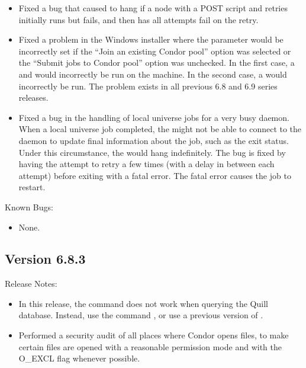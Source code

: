 \begin{itemize}
\item Fixed a bug that caused  to hang if a node
with a POST script and retries initially runs but fails, and then
has all  attempts fail on the retry.

\item Fixed a problem in the Windows installer where the
 parameter would be incorrectly set if the ``Join
an existing Condor pool'' option was selected or the ``Submit jobs to
Condor pool'' option was unchecked.  In the first case, a
 and  would incorrectly be run on
the machine. In the second case, a  would incorrectly
be run. The problem exists in all previous 6.8 and 6.9 series
releases.

\item Fixed a bug in the handling of local universe jobs
for a very busy  daemon.
When a local universe job completed, the  might not
be able to connect to the  daemon to update final information
about the job, such as the exit status.
Under this circumstance,
the  would hang indefinitely.
The bug is fixed by having the  attempt
to retry a few times (with a delay in between each attempt) before
exiting with a fatal error.
The fatal error causes the job to restart.

\end{itemize}

\noindent Known Bugs:

\begin{itemize}

\item None.

\end{itemize}




\subsection*{\label{sec:New-6-8-3}Version 6.8.3}

\noindent Release Notes:

\begin{itemize}

\item In this release,
the command   does not work when querying
the Quill database.
Instead, use the command
  ,
or use a previous version of .

\item Performed a security audit of all places where Condor opens files,
to make certain files are opened with a reasonable permission mode
and with the
O\_EXCL flag whenever possible.

\end{itemize}


